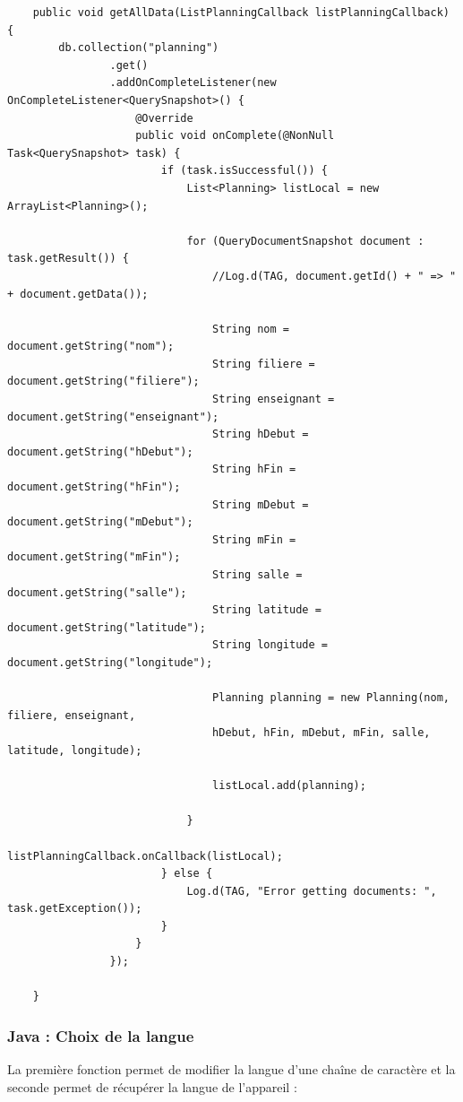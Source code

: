 \documentclass{article}
\begin{document}
\begin{verbatim}
    public void getAllData(ListPlanningCallback listPlanningCallback) {
        db.collection("planning")
                .get()
                .addOnCompleteListener(new OnCompleteListener<QuerySnapshot>() {
                    @Override
                    public void onComplete(@NonNull Task<QuerySnapshot> task) {
                        if (task.isSuccessful()) {
                            List<Planning> listLocal = new ArrayList<Planning>();

                            for (QueryDocumentSnapshot document : task.getResult()) {
                                //Log.d(TAG, document.getId() + " => " + document.getData());

                                String nom = document.getString("nom");
                                String filiere = document.getString("filiere");
                                String enseignant = document.getString("enseignant");
                                String hDebut = document.getString("hDebut");
                                String hFin = document.getString("hFin");
                                String mDebut = document.getString("mDebut");
                                String mFin = document.getString("mFin");
                                String salle = document.getString("salle");
                                String latitude = document.getString("latitude");
                                String longitude = document.getString("longitude");

                                Planning planning = new Planning(nom, filiere, enseignant,
                                hDebut, hFin, mDebut, mFin, salle, latitude, longitude);

                                listLocal.add(planning);

                            }
                            listPlanningCallback.onCallback(listLocal);
                        } else {
                            Log.d(TAG, "Error getting documents: ", task.getException());
                        }
                    }
                });

    }
\end{verbatim}




\newpage %




\subsubsection{Java : Choix de la langue}
La première fonction permet de modifier la langue d'une chaîne de caractère et la seconde permet de récupérer la langue de l'appareil :
\end{document}
